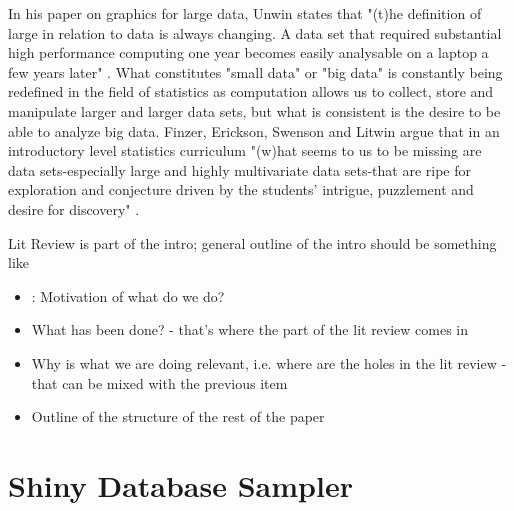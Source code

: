 \documentclass{article}\usepackage[]{graphicx}\usepackage[]{color}
\newcommand{\hh}[1]{{\color{ForestGreen} #1}}
\begin{document}
In his paper on graphics for large data, Unwin states that "(t)he definition of large in relation to data is always changing. A data set that required substantial high performance computing one year becomes easily analysable on a laptop a few years later"  \citep[][p.~129]{Unwin1999}. What constitutes "small data" or "big data" is constantly being redefined in the field of statistics as computation allows us to collect, store and manipulate larger and larger data sets, but what is consistent is the desire to be able to analyze big data.  Finzer, Erickson, Swenson and Litwin argue that in an introductory level statistics curriculum "(w)hat seems to us to be missing are data sets-especially large and highly multivariate data sets-that are ripe for exploration and conjecture driven by the students' intrigue, puzzlement and desire for discovery" \citep[][p.~1]{Finzer2007}.

\hh{Lit Review is part of the intro; general outline of the intro should be something like
\begin{itemize}
\item: Motivation of what do we do?
\item What has been done? - that's where the part of the lit review comes in
\item Why is what we are doing relevant, i.e. where are the holes in the lit review - that can be mixed with the previous item
\item Outline of the structure of the rest of the paper
\end{itemize}}


\section{Shiny Database Sampler}
\end{document}

